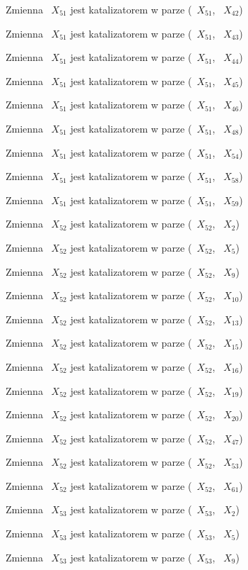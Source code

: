 \documentclass{article}
\begin{document}
Zmienna ~$X_{51}$ jest katalizatorem w parze (~$X_{51}$, ~$X_{42}$)

Zmienna ~$X_{51}$ jest katalizatorem w parze (~$X_{51}$, ~$X_{43}$)

Zmienna ~$X_{51}$ jest katalizatorem w parze (~$X_{51}$, ~$X_{44}$)

Zmienna ~$X_{51}$ jest katalizatorem w parze (~$X_{51}$, ~$X_{45}$)

Zmienna ~$X_{51}$ jest katalizatorem w parze (~$X_{51}$, ~$X_{46}$)

Zmienna ~$X_{51}$ jest katalizatorem w parze (~$X_{51}$, ~$X_{48}$)

Zmienna ~$X_{51}$ jest katalizatorem w parze (~$X_{51}$, ~$X_{54}$)

Zmienna ~$X_{51}$ jest katalizatorem w parze (~$X_{51}$, ~$X_{58}$)

Zmienna ~$X_{51}$ jest katalizatorem w parze (~$X_{51}$, ~$X_{59}$)

Zmienna ~$X_{52}$ jest katalizatorem w parze (~$X_{52}$, ~$X_{2}$)

Zmienna ~$X_{52}$ jest katalizatorem w parze (~$X_{52}$, ~$X_{5}$)

Zmienna ~$X_{52}$ jest katalizatorem w parze (~$X_{52}$, ~$X_{9}$)

Zmienna ~$X_{52}$ jest katalizatorem w parze (~$X_{52}$, ~$X_{10}$)

Zmienna ~$X_{52}$ jest katalizatorem w parze (~$X_{52}$, ~$X_{13}$)

Zmienna ~$X_{52}$ jest katalizatorem w parze (~$X_{52}$, ~$X_{15}$)

Zmienna ~$X_{52}$ jest katalizatorem w parze (~$X_{52}$, ~$X_{16}$)

Zmienna ~$X_{52}$ jest katalizatorem w parze (~$X_{52}$, ~$X_{19}$)

Zmienna ~$X_{52}$ jest katalizatorem w parze (~$X_{52}$, ~$X_{20}$)

Zmienna ~$X_{52}$ jest katalizatorem w parze (~$X_{52}$, ~$X_{47}$)

Zmienna ~$X_{52}$ jest katalizatorem w parze (~$X_{52}$, ~$X_{53}$)

Zmienna ~$X_{52}$ jest katalizatorem w parze (~$X_{52}$, ~$X_{61}$)

Zmienna ~$X_{53}$ jest katalizatorem w parze (~$X_{53}$, ~$X_{2}$)

Zmienna ~$X_{53}$ jest katalizatorem w parze (~$X_{53}$, ~$X_{5}$)

Zmienna ~$X_{53}$ jest katalizatorem w parze (~$X_{53}$, ~$X_{9}$)
\end{document}
